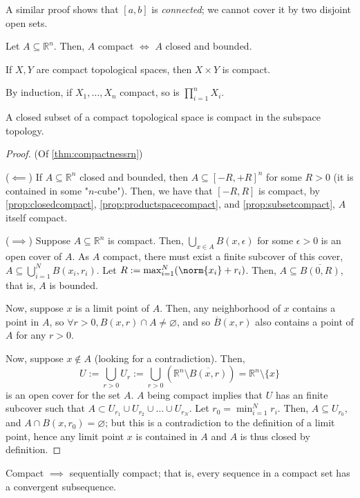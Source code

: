 \begin{remark}
    A similar proof shows that $[a, b]$ is \emph{connected}; we cannot cover it by two disjoint open sets.
\end{remark}

\begin{theorem}[On Compactness]\label{thm:compactnessrn}
    Let $A \subseteq \mathbb{R}^n$. Then, $A$ compact $\iff$ $A$ closed and bounded.
\end{theorem}

\begin{proposition}\label{prop:productspacecompact}
    If $X, Y$ are compact topological spaces, then $X \times Y$ is compact.    
\end{proposition}

\begin{remark}
    By induction, if $X_1, \dots, X_n$ compact, so is $\prod_{i=1}^{n} X_i$.
\end{remark}

\begin{proposition}\label{prop:subsetcompact}
    A closed subset of a compact topological space is compact in the subspace topology.
\end{proposition}

\begin{proof}(Of \cref{thm:compactnessrn})

    \noindent($\impliedby$) If $A \subseteq \mathbb{R}^n$ closed and bounded, then $A \subseteq [-R, +R]^n$ for some $R > 0$ (it is contained in some "$n$-cube"). Then, we have that $[-R, R]$ is compact, by \cref{prop:closedcompact}, \cref{prop:productspacecompact}, and \cref{prop:subsetcompact}, $A$ itself compact.
    
    \noindent($\implies$) Suppose $A \subseteq \mathbb{R}^n$ is compact. Then, $\bigcup_{x \in A} B(x, \epsilon)$ for some $\epsilon > 0$ is an open cover of $A$. As $A$ compact, there must exist a finite subcover of this cover, $A \subseteq \bigcup_{i = 1}^N B(x_i, r_i)$. Let $R := \max_{i=1}^{N} (\norm{x_i} + r_i)$. Then, $A \subseteq \overline{B(0, R)}$, that is, $A$ is bounded.

    Now, suppose $x$ is a limit point of $A$. Then, any neighborhood of $x$ contains a point in $A$, so $\forall r > 0, B(x, r) \cap A \neq \varnothing$, and so $\overline{B}(x, r)$ also contains a point of $A$ for any $r > 0$. 
    
    Now, suppose $x \notin A$ (looking for a contradiction). Then, \[
    U :=\bigcup_{r > 0} U_r :=  \bigcup_{r > 0} (\mathbb{R}^n \setminus \overline{B(x, r)}) = \mathbb{R}^n \setminus \{x\}
    \]
    is an open cover for the set $A$. $A$ being compact implies that $U$ has an finite subcover such that $A \subset U_{r_1} \cup U_{r_2} \cup \dots \cup U_{r_N}$. Let $r_0 = \min_{i=1}^N r_i$. Then, $A \subseteq U_{r_0}$, and $A \cap B(x, r_0) = \varnothing$; but this is a contradiction to the definition of a limit point, hence any limit point $x$ is contained in $A$ and $A$ is thus closed by definition.
\end{proof}

\begin{proposition}
    Compact $\implies$ sequentially compact; that is, every sequence in a compact set has a convergent subsequence. 
\end{proposition}